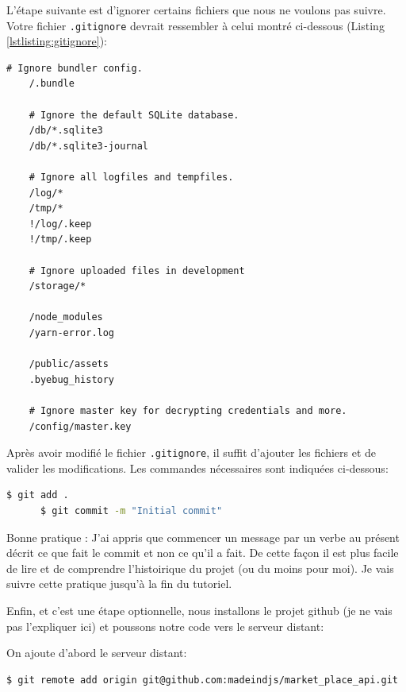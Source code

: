 \documentclass[]{report}
\begin{document}
    L'étape suivante est d'ignorer certains fichiers que nous ne voulons pas suivre. Votre fichier \verb|.gitignore| devrait ressembler à celui montré ci-dessous (Listing \ref{lstlisting:gitignore}):

    \begin{scriptsize}
    \begin{lstlisting}[breaklines, caption={La version modifiée du fichier .gitignore}, label={lstlisting:gitignore}]
    # Ignore bundler config.
    /.bundle

    # Ignore the default SQLite database.
    /db/*.sqlite3
    /db/*.sqlite3-journal

    # Ignore all logfiles and tempfiles.
    /log/*
    /tmp/*
    !/log/.keep
    !/tmp/.keep

    # Ignore uploaded files in development
    /storage/*

    /node_modules
    /yarn-error.log

    /public/assets
    .byebug_history

    # Ignore master key for decrypting credentials and more.
    /config/master.key
    \end{lstlisting}
    \end{scriptsize}

    Après avoir modifié le fichier \verb|.gitignore|, il suffit d'ajouter les fichiers et de valider les modifications. Les commandes nécessaires sont indiquées ci-dessous:

    \begin{scriptsize}
      \begin{lstlisting}[language=bash]
      $ git add .
      $ git commit -m "Initial commit"
      \end{lstlisting}
    \end{scriptsize}

    Bonne pratique : J'ai appris que commencer un message par un verbe au présent décrit ce que fait le commit et non ce qu'il a fait. De cette façon il est plus facile de lire et de comprendre l'histoirique du projet (ou du moins pour moi). Je vais suivre cette pratique jusqu'à la fin du tutoriel.

    Enfin, et c'est une étape optionnelle, nous installons le projet github (je ne vais pas l'expliquer ici) et poussons notre code vers le serveur distant:

    On ajoute d'abord le serveur distant:

    \begin{scriptsize}
      \begin{lstlisting}[language=bash]
      $ git remote add origin git@github.com:madeindjs/market_place_api.git
      \end{lstlisting}
    \end{scriptsize}
\end{document}

